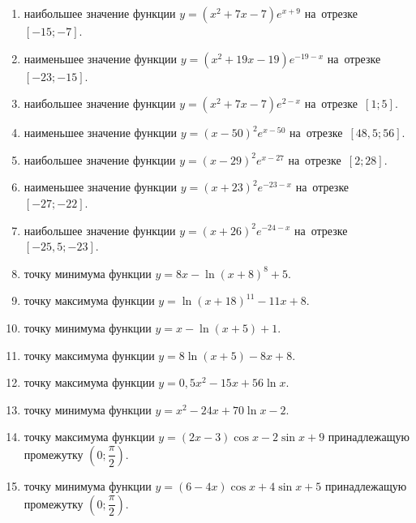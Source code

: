 \documentclass[a4paper,10pt]{article}
\begin{document}
\begin{enumerate}
\item {} наибольшее значение функции $y=\left(x^2 +7x -7\right)e^{x+9}$ на~отрезке~$\left[-15;-7\right]$.

\item {} наименьшее значение функции $y=\left(x^2 +19x -19\right)e^{-19-x}$ на~отрезке~$\left[-23;-15\right]$.

\item {} наибольшее значение функции $y=\left(x^2 +7x -7\right)e^{2-x}$ на~отрезке~$\left[1;5\right]$.

\item {} наименьшее значение функции $y=\left(x-50\right)^2e^{x-50}$ на~отрезке~$\left[48,5;56\right]$.

\item {} наибольшее значение функции $y=\left(x-29\right)^2e^{x-27}$ на~отрезке~$\left[2;28\right]$.

\item {} наименьшее значение функции $y=\left(x+23\right)^2e^{-23-x}$ на~отрезке~$\left[-27;-22\right]$.

\item {} наибольшее значение функции $y=\left(x+26\right)^2e^{-24-x}$ на~отрезке~$\left[-25,5;-23\right]$.

\item {} точку минимума функции $y=8x-\ln\left(x+8\right)^{8}+5$.

\item {} точку максимума функции $y=\ln\left(x+18\right)^{11}-11x+8$.

\item {} точку минимума функции $y=x-\ln\left(x+5\right)+1$.

\item {} точку максимума функции $y=8\ln\left(x+5\right)-8x+8$.

\item {} точку максимума функции $y=0,5x^2-15x+56\ln x $.

\item {} точку минимума функции $y=x^2-24x+70\ln x -2$.

\item {} точку максимума функции $y=\left(2x-3\right)\cos x -2\sin x+9$
принадлежащую промежутку $\left(0;\dfrac{\pi}{2}\right)$.

\item {} точку минимума функции $y=\left(6-4x\right)\cos x +4\sin x+5$
принадлежащую промежутку $\left(0;\dfrac{\pi}{2}\right)$.


\end{enumerate}
\end{document}

